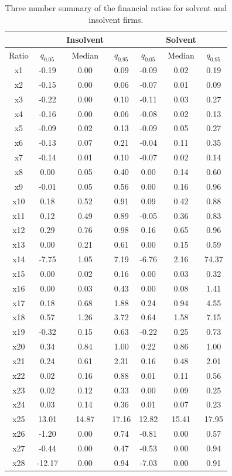 \documentclass{article}
\begin{document}
\begin{table}
\begin{center}
\caption{Three number summary of the financial ratios for solvent and insolvent firms.}
\footnotesize
\begin{tabular}{c|ccc|ccc} 
\hline\hline
&&Insolvent&&&Solvent&\\ 
\hline
Ratio & $q_{0.05}$ & Median & $q_{0.95}$ & $q_{0.05}$ & Median & $q_{0.95}$\\
\hline
x1 & -0.19 & 0.00 & 0.09 & -0.09 & 0.02 & 0.19\\
x2 & -0.15 & 0.00 & 0.06 & -0.07 & 0.01 & 0.09\\
x3 & -0.22 & 0.00 & 0.10 & -0.11 & 0.03 & 0.27\\
x4 & -0.16 & 0.00 & 0.06 & -0.08 & 0.02 & 0.13\\
x5 & -0.09 & 0.02 & 0.13 & -0.09 & 0.05 & 0.27\\
x6 & -0.13 & 0.07 & 0.21 & -0.04 & 0.11 & 0.35\\
x7 & -0.14 & 0.01 & 0.10 & -0.07 & 0.02 & 0.14\\
x8 & 0.00 & 0.05 & 0.40 & 0.00 & 0.14 & 0.60\\
x9 & -0.01 & 0.05 & 0.56 & 0.00 & 0.16 & 0.96\\
x10 & 0.18 & 0.52 & 0.91 & 0.09 & 0.42 & 0.88\\
x11 & 0.12 & 0.49 & 0.89 & -0.05 & 0.36 & 0.83\\
x12 & 0.29 & 0.76 & 0.98 & 0.16 & 0.65 & 0.96\\
x13 & 0.00 & 0.21 & 0.61 & 0.00 & 0.15 & 0.59\\
x14 & -7.75 & 1.05 & 7.19 & -6.76 & 2.16 & 74.37\\
x15 & 0.00 & 0.02 & 0.16 & 0.00 & 0.03 & 0.32\\
x16 & 0.00 & 0.03 & 0.43 & 0.00 & 0.08 & 1.41\\
x17 & 0.18 & 0.68 & 1.88 & 0.24 & 0.94 & 4.55\\
x18 & 0.57 & 1.26 & 3.72 & 0.64 & 1.58 & 7.15\\
x19 & -0.32 & 0.15 & 0.63 & -0.22 & 0.25 & 0.73\\
x20 & 0.34 & 0.84 & 1.00 & 0.22 & 0.86 & 1.00\\
x21 & 0.24 & 0.61 & 2.31 & 0.16 & 0.48 & 2.01\\
x22 & 0.02 & 0.16 & 0.88 & 0.01 & 0.11 & 0.56\\
x23 & 0.02 & 0.12 & 0.33 & 0.00 & 0.09 & 0.25\\
x24 & 0.03 & 0.14 & 0.36 & 0.01 & 0.07 & 0.23\\
x25 & 13.01 & 14.87 & 17.16 & 12.82 & 15.41 & 17.95\\
x26 & -1.20 & 0.00 & 0.74 & -0.81 & 0.00 & 0.57\\
x27 & -0.44 & 0.00 & 0.47 & -0.53 & 0.00 & 0.94\\
x28 & -12.17 & 0.00 & 0.94 & -7.03 & 0.00 & 0.91\\
\hline\hline
\end{tabular}
\end{center}
\end{table}
\end{document}
